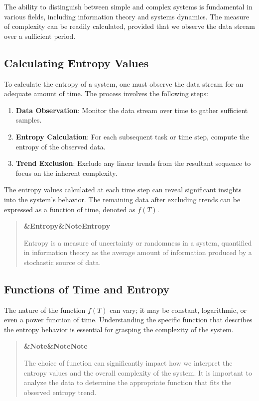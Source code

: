\documentclass[a4paper]{article}
\newcommand{\boxheading}[1]{%
  \par\smallskip
  \noindent\textbf{\ifx&#1&Note\else#1\fi}\par
  \smallskip
}
\newenvironment{defbox}[1][]{%
  \begin{quote}\color{green!40!black}\boxheading{#1}\normalcolor
}{\end{quote}}
\newenvironment{rembox}[1][]{%
  \begin{quote}\color{black!70}\boxheading{#1}\normalcolor
}{\end{quote}}
\begin{document}
The ability to distinguish between simple and complex systems is fundamental in various fields, including information theory and systems dynamics. The measure of complexity can be readily calculated, provided that we observe the data stream over a sufficient period.

\subsection{Calculating Entropy Values}
To calculate the entropy of a system, one must observe the data stream for an adequate amount of time. The process involves the following steps:

\begin{enumerate}
    \item \textbf{Data Observation}: Monitor the data stream over time to gather sufficient samples.
    \item \textbf{Entropy Calculation}: For each subsequent task or time step, compute the entropy of the observed data.
    \item \textbf{Trend Exclusion}: Exclude any linear trends from the resultant sequence to focus on the inherent complexity.
\end{enumerate}

The entropy values calculated at each time step can reveal significant insights into the system's behavior. The remaining data after excluding trends can be expressed as a function of time, denoted as \( f(T) \).

\begin{defbox}[Entropy]
Entropy is a measure of uncertainty or randomness in a system, quantified in information theory as the average amount of information produced by a stochastic source of data.
\end{defbox}

\subsection{Functions of Time and Entropy}
The nature of the function \( f(T) \) can vary; it may be constant, logarithmic, or even a power function of time. Understanding the specific function that describes the entropy behavior is essential for grasping the complexity of the system.

\begin{rembox}[Note]
The choice of function can significantly impact how we interpret the entropy values and the overall complexity of the system. It is important to analyze the data to determine the appropriate function that fits the observed entropy trend.
\end{rembox}
\end{document}
